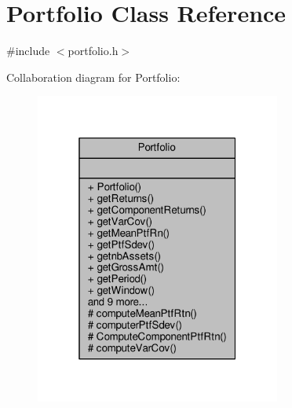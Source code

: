\hypertarget{classPortfolio}{}\section{Portfolio Class Reference}
\label{classPortfolio}


{\ttfamily \#include $<$portfolio.\+h$>$}



Collaboration diagram for Portfolio\+:
\nopagebreak
\begin{figure}[H]
\begin{center}
\leavevmode
\includegraphics[width=229pt]{classPortfolio__coll__graph}
\end{center}
\end{figure}
